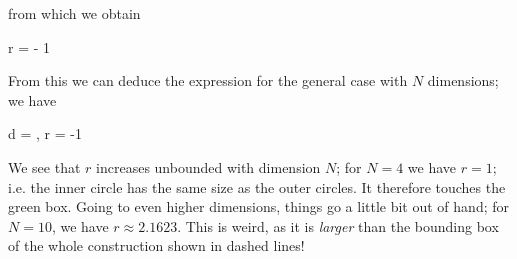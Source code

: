 from which we obtain

\bee
r =  - 1 
\eee

From this we can deduce the expression for the general case with $N$ dimensions; we have

\bee
d = , \quad r = -1
\eee

We see that $r$ increases unbounded with dimension $N$; for $N=4$ we have $r = 1$; i.e. the inner circle has the same size as the outer circles. It therefore touches the green box. Going to even higher dimensions, things go a little bit out of hand; for $N=10$, we have $r \approx 2.1623$. This is weird, as it is \emph{larger} than the bounding box of the whole construction shown in dashed lines! 


